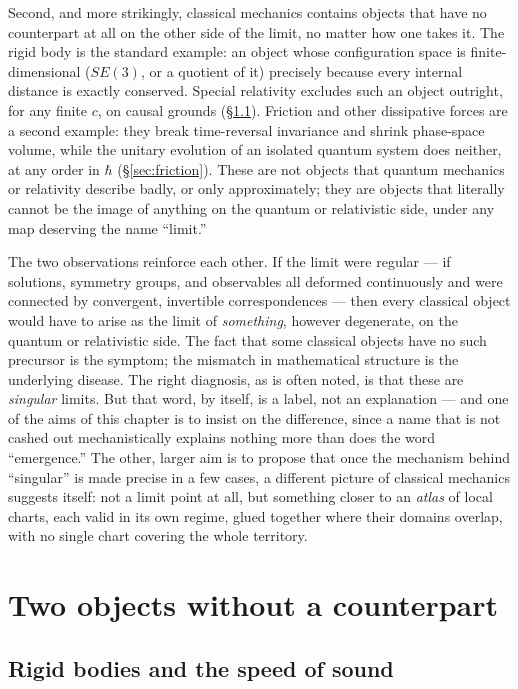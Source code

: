 \documentclass[11pt]{book}
\begin{document}
Second, and more strikingly, classical mechanics contains objects that have no counterpart at all on the other side of the limit, no matter how one takes it. The rigid body is the standard example: an object whose configuration space is finite-dimensional ($SE(3)$, or a quotient of it) precisely because every internal distance is exactly conserved. Special relativity excludes such an object outright, for any finite $c$, on causal grounds (\S\ref{sec:rigid}). Friction and other dissipative forces are a second example: they break time-reversal invariance and shrink phase-space volume, while the unitary evolution of an isolated quantum system does neither, at any order in $\hbar$ (\S\ref{sec:friction}). These are not objects that quantum mechanics or relativity describe badly, or only approximately; they are objects that literally cannot be the image of anything on the quantum or relativistic side, under any map deserving the name ``limit.''

The two observations reinforce each other. If the limit were regular --- if solutions, symmetry groups, and observables all deformed continuously and were connected by convergent, invertible correspondences --- then every classical object would have to arise as the limit of \emph{something}, however degenerate, on the quantum or relativistic side. The fact that some classical objects have no such precursor is the symptom; the mismatch in mathematical structure is the underlying disease. The right diagnosis, as is often noted, is that these are \emph{singular} limits. But that word, by itself, is a label, not an explanation --- and one of the aims of this chapter is to insist on the difference, since a name that is not cashed out mechanistically explains nothing more than does the word ``emergence.'' The other, larger aim is to propose that once the mechanism behind ``singular'' is made precise in a few cases, a different picture of classical mechanics suggests itself: not a limit point at all, but something closer to an \emph{atlas} of local charts, each valid in its own regime, glued together where their domains overlap, with no single chart covering the whole territory.

\section{Two objects without a counterpart}

\subsection{Rigid bodies and the speed of sound}
\label{sec:rigid}
\end{document}
